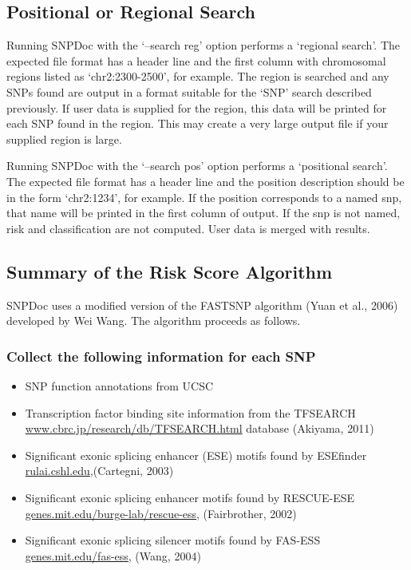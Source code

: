 \documentclass[11pt]{article}
\begin{document}
\subsection{Positional or Regional Search}
\label{sec-4-3}


   Running SNPDoc with the `--search reg' option performs a `regional search'.
   The expected file format has a header line and the first column with
   chromosomal regions listed as `chr2:2300-2500', for example.  The region is
   searched and any SNPs found are output in a format suitable for the `SNP'
   search described previously.  If user data is supplied for the region, this
   data will be printed for each SNP found in the region.  This may create a
   very large output file if your supplied region is large.

   Running SNPDoc with the `--search pos' option performs a `positional search'.
   The expected file format has a header line and the position description
   should be in the form `chr2:1234', for example.  If the position corresponds
   to a named snp, that name will be printed in the first column of output.  If
   the snp is not named, risk and classification are not computed.  User data is
   merged with results.
\subsection{Summary of the Risk Score Algorithm}
\label{sec-4-4}


   SNPDoc uses a modified version of the FASTSNP algorithm (Yuan et al., 2006)
   developed by Wei Wang.  The algorithm proceeds as follows.
\subsubsection{Collect the following information for each SNP}
\label{sec-4-4-1}


\begin{itemize}
\item SNP function annotations from UCSC
\item Transcription factor binding site information from the TFSEARCH
      \hyperref[www.cbrc.jp-research-db-TFSEARCH.html]{www.cbrc.jp/research/db/TFSEARCH.html} database (Akiyama, 2011)
\item Significant exonic splicing enhancer (ESE) motifs found by ESEfinder
      \hyperref[rulai.cshl.edu]{rulai.cshl.edu},(Cartegni, 2003)
\item Significant exonic splicing enhancer motifs found by RESCUE-ESE
      \hyperref[genes.mit.edu-burge-lab-rescue-ess]{genes.mit.edu/burge-lab/rescue-ess}, (Fairbrother, 2002)
\item Significant exonic splicing silencer motifs found by FAS-ESS
      \hyperref[genes.mit.edu-fas-ess]{genes.mit.edu/fas-ess}, (Wang, 2004)
\end{itemize}
\end{document}
